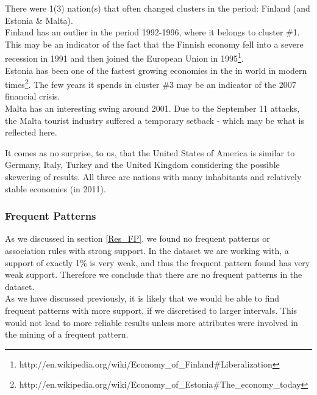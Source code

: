 There were 1(3) nation(s) that often changed clusters in the period: Finland (and Estonia \& Malta).
\\Finland has an outlier in the period 1992-1996, where it belongs to cluster \#1. This may be an indicator of the fact that the Finnish economy fell into a severe recession in 1991 and then joined the European Union in 1995\footnote{http://en.wikipedia.org/wiki/Economy\_of\_Finland\#Liberalization}.
\\Estonia has been one of the fastest growing economies in the in world in modern times\footnote{http://en.wikipedia.org/wiki/Economy\_of\_Estonia\#The\_economy\_today}. The few years it spends in cluster \#3 may be an indicator of the 2007 financial crisis.
\\Malta has an interesting swing around 2001. Due to the September 11 attacks, the Malta tourist industry suffered a temporary setback - which may be what is reflected here.

It comes as no surprise, to us, that the United States of America is similar to Germany, Italy, Turkey and the United Kingdom considering the possible skewering of results. All three are nations with many inhabitants and relatively stable economies (in 2011).

\subsubsection*{Frequent Patterns}
As we discussed in section \ref{Res_FP}, we found no frequent patterns or association rules with strong support. In the dataset we are working with, a support of exactly 1\% is very weak, and thus the frequent pattern found has very weak support. Therefore we conclude that there are no frequent patterns in the dataset.
\\As we have discussed previously, it is likely that we would be able to find frequent patterns with more support, if we discretised to larger intervals. This would not lead to more reliable results unless more attributes were involved in the mining of a frequent pattern.
